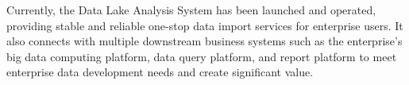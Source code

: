\begin{abstract*}
Currently, the Data Lake Analysis System has been launched and operated,
providing stable and reliable one-stop data import services for enterprise
users. It also connects with multiple downstream business systems such as
the enterprise's big data computing platform, data query platform, and report
platform to meet enterprise data development needs and create significant value.

\end{abstract*}
